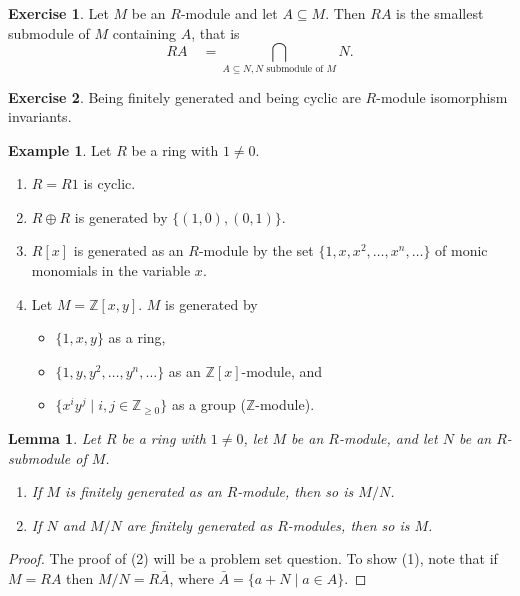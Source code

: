 \documentclass[12pt]{report}
\newtheorem{lemma}[theorem]{Lemma}
\numberwithin{equation}{section}
\numberwithin{theorem}{chapter}
\theoremstyle{definition}
\newtheorem{example}[theorem]{Example}
\newtheorem{exercise}{Exercise}
\newtheorem*{basic properties}{Basic Properties}
\newtheorem*{Important Remark}{Important Remark}
\newcommand{\Z}{\mathbb{Z}}
\begin{document}
\begin{exercise}
 Let $M$ be an $R$-module and let $A \subseteq M$. Then $RA$ is the smallest submodule of $M$ containing $A$, that is 
 $$RA \quad = \bigcap\limits_{A\subseteq N, N \text{ submodule of }M} N.$$
\end{exercise}

\begin{exercise}
Being finitely generated and being cyclic are $R$-module isomorphism invariants.
\end{exercise}

\begin{example}
Let $R$ be a ring with $1 \neq 0$.
\begin{enumerate}[label=(\arabic*),leftmargin=20pt]
\item $R = R1$ is cyclic. 
\item $R \oplus R $ is generated by $\{(1,0),(0,1)\}$. 
\item $R[x]$ is generated as an $R$-module by the set $\{1,x,x^2,\ldots, x^n,\ldots\}$ of monic monomials in the variable $x$.
\item Let $M = \Z[x,y]$. $M$ is generated by 
\begin{itemize}
\item $\{1,x,y\}$ as a ring,  
\item $\{1,y,y^2,\ldots, y^n,\ldots\}$ as an $\Z[x]$-module, and 
\item $\{x^iy^j \mid  i,j \in \Z_{\geqslant 0}\}$ as a group ($\Z$-module).
\end{itemize}
\end{enumerate}
\end{example}
 
\begin{lemma}\label{lem:fg}
 Let $R$ be a ring with $1 \neq 0$, let $M$ be an $R$-module, and let $N$ be an $R$-submodule of $M$. 
\begin{enumerate}[label=(\arabic*),leftmargin=20pt]
\item  If $M$ is finitely generated as an $R$-module, then so is $M/N$. 
\item If $N$ and $M/N$ are finitely generated as $R$-modules, then so is $M$.
\end{enumerate}
\end{lemma}

\begin{proof}
The proof of (2) will be a problem set question. To show (1), note that if $M=RA$ then $M/N=R\bar{A}$, where $\bar{A}=\{a+N \mid a\in A\}$. 
\end{proof}
\end{document}
